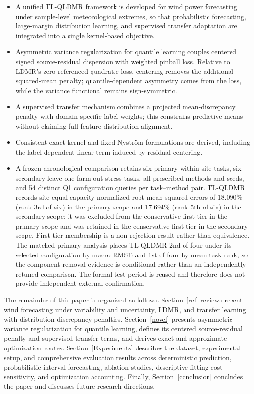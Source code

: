 \documentclass[a4paper]{cas-sc}
\begin{document}
\begin{itemize}
    \item A unified TL-QLDMR framework is developed for wind power forecasting under {\color{blue}sample-level meteorological extremes}, so that probabilistic forecasting, large-margin distribution learning, and supervised transfer adaptation are integrated into a single kernel-based objective.
    \item {\color{blue}Asymmetric variance regularization for quantile learning couples centered signed source-residual dispersion with weighted pinball loss. Relative to LDMR's zero-referenced quadratic loss, centering removes the additional squared-mean penalty; quantile-dependent asymmetry comes from the loss, while the variance functional remains sign-symmetric.}
    \item {\color{blue}A supervised transfer mechanism combines a projected mean-discrepancy penalty with domain-specific label weights; this constrains predictive means without claiming full feature-distribution alignment.}
    \item {\color{blue}Consistent exact-kernel and fixed Nystr\"{o}m formulations are derived, including the label-dependent linear term induced by residual centering.}
    \item {\color{blue}A frozen chronological comparison retains six primary within-site tasks, six secondary leave-one-farm-out stress tasks, all prescribed methods and seeds, and 54 distinct Q1 configuration queries per task--method pair. TL-QLDMR records site-equal capacity-normalized root mean squared errors of 18.090\% (rank 3rd of six) in the primary scope and 17.694\% (rank 5th of six) in the secondary scope; it was excluded from the conservative first tier in the primary scope and was retained in the conservative first tier in the secondary scope. First-tier membership is a non-rejection result rather than equivalence. The matched primary analysis places TL-QLDMR 2nd of four under its selected configuration by macro RMSE and 1st of four by mean task rank, so the component-removal evidence is conditional rather than an independently retuned comparison. The formal test period is reused and therefore does not provide independent external confirmation.}
\end{itemize}


The remainder of this paper is organized as follows. {\color{blue}Section~\ref{rel} reviews recent wind forecasting under variability and uncertainty, LDMR, and transfer learning with distribution-discrepancy penalties. Section~\ref{novel} presents asymmetric variance regularization for quantile learning, defines its centered source-residual penalty and supervised transfer terms, and derives exact and approximate optimization routes.} Section~\ref{Experiments} describes the dataset, experimental setup, and comprehensive evaluation results across deterministic prediction, probabilistic interval forecasting, ablation studies, {\color{blue}descriptive fitting-cost sensitivity, and optimization accounting}. Finally, Section~\ref{conclusion} concludes the paper and discusses future research directions.
\end{document}
